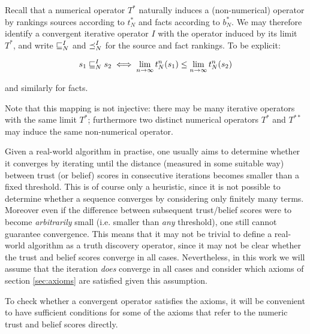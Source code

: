 \documentclass[../main.tex]{subfiles}
\begin{document}
\begin{remark}
Recall that a numerical operator $T^*$ naturally induces a (non-numerical)
operator by rankings sources according to $t_N^*$ and facts according to
$b_N^*$. We may therefore identify a convergent iterative operator $I$ with the
operator induced by its limit $T^*$, and write $\sqsubseteq_N^I$ and $\preceq_N^I$ for
the source and fact rankings. To be explicit:

$$ s_1 \sqsubseteq_N^I s_2 \iff \lim_{n \rightarrow \infty}{t_N^n(s_1)} \le \lim_{n
\rightarrow \infty}{t_N^n(s_2)} $$

and similarly for facts.

Note that this mapping is not injective: there may be many iterative operators
with the same limit $T^*$; furthermore two distinct numerical operators $T^*$
and $T^{**}$ may induce the same non-numerical operator.
\end{remark}

Given a real-world algorithm in practise, one usually aims to determine whether
it converges by iterating until the distance (measured in some suitable way)
between trust (or belief) scores in consecutive iterations becomes smaller than
a fixed threshold. This is of course only a heuristic, since it is not possible
to determine whether a sequence converges by considering only finitely many
terms. Moreover even if the difference between subsequent trust/belief scores
were to become \emph{arbitrarily} small (i.e. smaller than \emph{any}
threshold), one still cannot guarantee convergence\footnotemark. This means
that it may not be trivial to define a real-world algorithm as a truth
discovery operator, since it may not be clear whether the trust and belief
scores converge in all cases. Nevertheless, in this work we will assume that
the iteration \emph{does} converge in all cases and consider which axioms of
section \ref{sec:axioms} are satisfied given this assumption.


To check whether a convergent operator satisfies the axioms, it will be
convenient to have sufficient conditions for some of the axioms that refer to
the numeric trust and belief scores directly.
\end{document}
